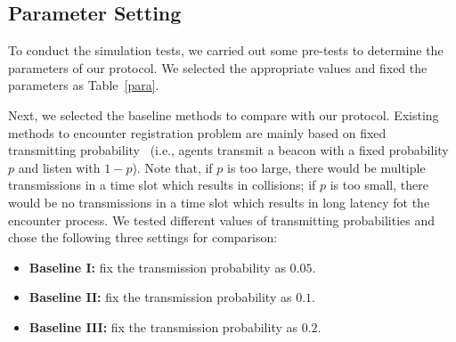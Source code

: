 \subsection{Parameter Setting}

To conduct the simulation tests, we carried out some pre-tests to determine the 
parameters of our protocol.
We selected the appropriate values and fixed the parameters as Table~\ref{para}.

\begin{table}[htbp]
	\caption{Parameter Settings}
	\label{para}
	\centering
\end{table}

Next, we selected the baseline methods to compare with our protocol. 
Existing methods to encounter registration problem are mainly based on fixed transmitting 
probability~\cite{Menhill2012NovelTelemetry,Rutz2012AutomatedMapping}
(i.e., agents transmit a beacon with a fixed probability $p$ and listen with $1-p$).  
Note that, if $p$ is too large, there would be multiple transmissions in a time slot which results in 
collisions; if $p$ is too small, there would be no transmissions in a time slot which results 
in long latency fot the encounter process.
We tested different values of transmitting probabilities and chose the following three settings for comparison: 
\begin{itemize}
    \item \textbf{Baseline I:} fix the transmission probability as $0.05$. 
    \item \textbf{Baseline II:} fix the transmission probability as $0.1$. 
    \item \textbf{Baseline III:} fix the transmission probability as $0.2$. 
\end{itemize}


